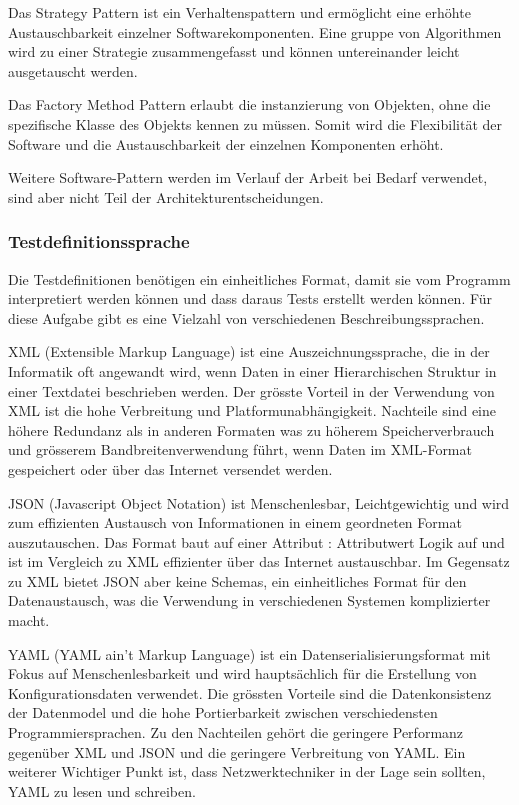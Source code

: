 \documentclass[
	ngerman,
	toc=listof, %
	toc=bibliography, %
	footnotes=multiple, %
	parskip=half, %
	numbers=noendperiod %
]{scrartcl}
\begin{document}
		Das Strategy Pattern ist ein Verhaltenspattern und ermöglicht eine erhöhte Austauschbarkeit einzelner Softwarekomponenten.
		Eine gruppe von Algorithmen wird zu einer Strategie zusammengefasst und können untereinander leicht ausgetauscht werden.
		
		Das Factory Method Pattern erlaubt die instanzierung von Objekten, ohne die spezifische Klasse des Objekts kennen zu müssen.
		Somit wird die Flexibilität der Software und die Austauschbarkeit der einzelnen Komponenten erhöht.
		
		Weitere Software-Pattern werden im Verlauf der Arbeit bei Bedarf verwendet, sind aber nicht Teil der Architekturentscheidungen.
		\newpage

		\subsubsection{Testdefinitionssprache}
		Die Testdefinitionen benötigen ein einheitliches Format, damit sie vom Programm interpretiert werden können und dass daraus Tests erstellt werden können.
		Für diese Aufgabe gibt es eine Vielzahl von verschiedenen Beschreibungssprachen.
		
		XML (Extensible Markup Language) ist eine Auszeichnungssprache, die in der Informatik oft angewandt wird, wenn Daten in einer Hierarchischen Struktur in einer Textdatei beschrieben werden.
		Der grösste Vorteil in der Verwendung von XML ist die hohe Verbreitung und Platformunabhängigkeit.
		Nachteile sind eine höhere Redundanz als in anderen Formaten was zu höherem Speicherverbrauch und grösserem Bandbreitenverwendung führt, wenn Daten im XML-Format gespeichert oder über das Internet versendet werden.

		JSON (Javascript Object Notation) ist Menschenlesbar, Leichtgewichtig und wird zum effizienten Austausch von Informationen in einem geordneten Format auszutauschen.
		Das Format baut auf einer Attribut : Attributwert Logik auf und ist im Vergleich zu XML effizienter über das Internet austauschbar.
		Im Gegensatz zu XML bietet JSON aber keine Schemas, ein einheitliches Format für den Datenaustausch, was die Verwendung in verschiedenen Systemen komplizierter macht.

		YAML (YAML ain't Markup Language) ist ein Datenserialisierungsformat mit Fokus auf Menschenlesbarkeit und wird hauptsächlich für die Erstellung von Konfigurationsdaten verwendet.
		Die grössten Vorteile sind die Datenkonsistenz der Datenmodel und die hohe Portierbarkeit zwischen verschiedensten Programmiersprachen.
		Zu den Nachteilen gehört die geringere Performanz gegenüber XML und JSON und die geringere Verbreitung von YAML.
		Ein weiterer Wichtiger Punkt ist, dass Netzwerktechniker in der Lage sein sollten, YAML zu lesen und schreiben.
\end{document}
